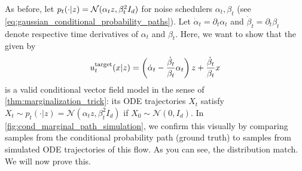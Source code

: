\begin{examplebox}
As before, let $p_t(\cdot|z) = \mathcal{N}(\alpha_t z,\beta_t^2 I_d)$ for noise schedulers $\alpha_t,\beta_t$ (see \cref{eq:gaussian_conditional_probability_paths}). Let $\dot{\alpha}_t=\partial_t\alpha_t$ and $\dot{\beta}_t=\partial_t\beta_t$ denote respective time derivatives of $\alpha_t$ and $\beta_t$. Here, we want to show that the  given by
\begin{align}
\label{eq:conditional_gaussian_vf}
    u^{\text{target}}_t(x|z) = \left(\dot{\alpha}_t-\frac{\dot{\beta}_t}{\beta_t}\alpha_t\right)z+\frac{\dot{\beta}_t}{\beta_t}x
\end{align}
is a valid conditional vector field model in the sense of \cref{thm:marginalization_trick}: its ODE trajectories $X_t$ satisfy $X_t\sim p_t(\cdot|z)=\mathcal{N}(\alpha_t z,\beta_t^2I_d)$ if $X_0\sim \mathcal{N}(0,I_d)$. In \cref{fig:cond_marginal_path_simulation}, we confirm this visually by comparing samples from the conditional probability path (ground truth) to samples from simulated ODE trajectories of this flow. As you can see, the distribution match. We will now prove this.


\end{examplebox}

